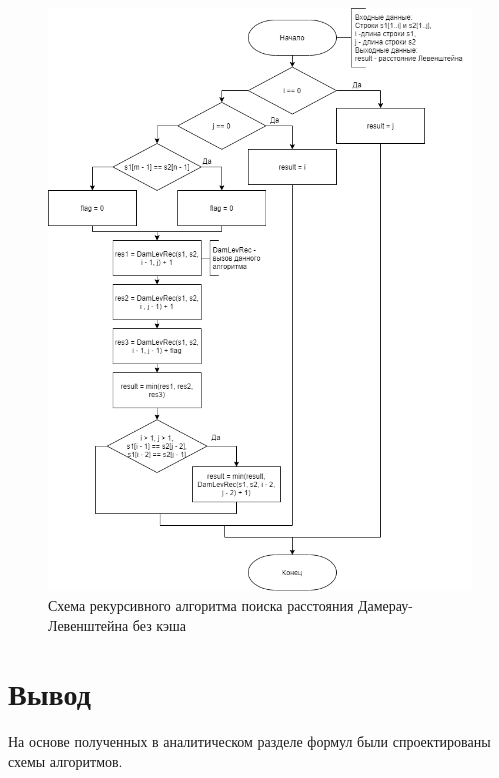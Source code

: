 \newpage 
\begin{figure}[H]
	\begin{center}
		\includegraphics[scale=0.6]{assets/DamLevRecWithoutCache.png}
	\end{center}
	\caption{Схема рекурсивного алгоритма поиска расстояния Дамерау-Левенштейна без кэша}
\end{figure}

\section{Вывод}

На основе полученных в аналитическом разделе формул были спроектированы схемы алгоритмов.